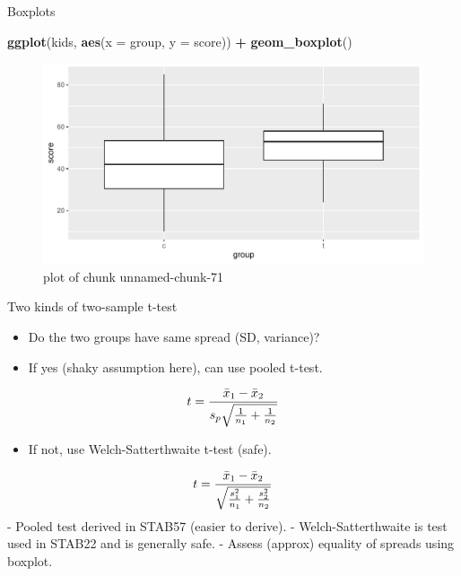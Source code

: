 \documentclass[
  ignorenonframetext,
]{beamer}
\newenvironment{Shaded}{\begin{snugshade}}{\end{snugshade}}
\newcommand{\DataTypeTok}[1]{\textcolor[rgb]{0.13,0.29,0.53}{#1}}
\newcommand{\KeywordTok}[1]{\textcolor[rgb]{0.13,0.29,0.53}{\textbf{#1}}}
\newcommand{\NormalTok}[1]{#1}
\newcommand{\OperatorTok}[1]{\textcolor[rgb]{0.81,0.36,0.00}{\textbf{#1}}}
\newcommand{\StringTok}[1]{\textcolor[rgb]{0.31,0.60,0.02}{#1}}
\providecommand{\tightlist}{%
  \setlength{\itemsep}{0pt}\setlength{\parskip}{0pt}}
\begin{document}
\begin{frame}[fragile]{Boxplots}
\protect\hypertarget{boxplots}{}

\begin{Shaded}
\begin{Highlighting}[]
\KeywordTok{ggplot}\NormalTok{(kids, }\KeywordTok{aes}\NormalTok{(}\DataTypeTok{x =}\NormalTok{ group, }\DataTypeTok{y =}\NormalTok{ score)) }\OperatorTok{+}\StringTok{ }\KeywordTok{geom_boxplot}\NormalTok{()}
\end{Highlighting}
\end{Shaded}

\begin{figure}
\centering
\includegraphics{figure/unnamed-chunk-71-1.pdf}
\caption{plot of chunk unnamed-chunk-71}
\end{figure}

\end{frame}

\begin{frame}{Two kinds of two-sample t-test}
\protect\hypertarget{two-kinds-of-two-sample-t-test}{}

\begin{itemize}
\tightlist
\item
  Do the two groups have same spread (SD, variance)?
\item
  If yes (shaky assumption here), can use pooled t-test.
\end{itemize}

\[ t = {\bar{x}_1 - \bar{x}_2 \over s_p \sqrt{ {1\over n_1} + {1 \over n_2}}} \]

\begin{itemize}
\tightlist
\item
  If not, use Welch-Satterthwaite t-test (safe).
\end{itemize}

\[ t = {\bar{x}_1 - \bar{x}_2 \over \sqrt{ {s_1^2 \over n_1} + {s_2^2 \over n_2}}} \]
- Pooled test derived in STAB57 (easier to derive). -
Welch-Satterthwaite is test used in STAB22 and is generally safe. -
Assess (approx) equality of spreads using boxplot.

\end{frame}
\end{document}
